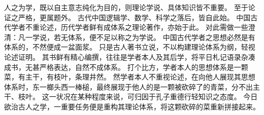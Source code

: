 \documentclass[11pt]{article}
\begin{document}
人之为学，既以自主意志纯化为目的，则理论学说、具体知识皆不重要。
至于论证之严格，更属题外。
古代中国逻辑学、数学、科学之落后，皆自此始。
中国古代学者不重论述，历代学者鲜有成体系之理论著作，亦始于此。
对此需做一些澄清：凡一学说，若无体系，便不足以称之为学说。
中国古代学者之思想必然是有体系的，不然便成一盆面浆。
只是古人著书立说，不以构建理论体系为纲，轻视论述证明。
其书鲜有精心编撰，往往是学者本人及其后学，将平日札记语录杂凑成书，无甚严格表达，自然不成体系。
打个比方，学者本人的思想体系是一颗菜，有主干，有枝叶，条理井然。
然学者本人不重视论述，在向他人展现其思想体系时，东一榔头西一棒槌，最终展现于他人的是一颗被砍碎了的青菜，分不出主干、枝叶。
这一状况在某种程度来说，可归因于孔子重德行轻知识之态度。
今日欲治古人之学，一重要任务便是重构其理论体系，将这颗砍碎的菜重新拼接起来。
  
\end{document}
